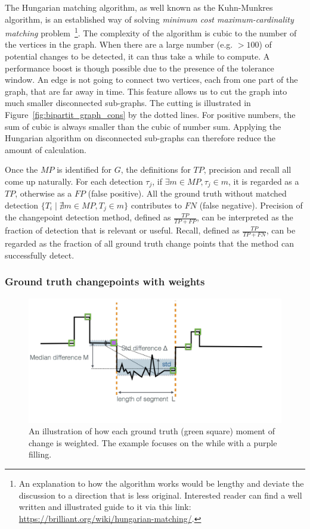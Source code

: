 The Hungarian matching algorithm, as well known as the Kuhn-Munkres algorithm, is an established way of solving \textit{minimum cost maximum-cardinality matching} problem~\footnote{An explanation to how the algorithm works would be lengthy and deviate the discussion to a direction that is less original. Interested reader can find a well written and illustrated guide to it via this link: \url{https://brilliant.org/wiki/hungarian-matching/}.}. 
The complexity of the algorithm is cubic to the number of the vertices in the graph.
When there are a large number (e.g. $> 100$) of potential changes to be detected, it can thus take a while to compute.
A performance boost is though possible due to the presence of the tolerance window.
An edge is not going to connect two vertices, each from one part of the graph, that are far away in time.
This feature allows us to cut the graph into much smaller disconnected sub-graphs.
The cutting is illustrated in Figure~\ref{fig:bipartit_graph_cons} by the dotted lines.
For positive numbers, the sum of cubic is always smaller than the cubic of number sum.
Applying the Hungarian algorithm on disconnected sub-graphs can therefore reduce the amount of calculation.

Once the $MP$ is identified for $G$, the definitions for $TP$, precision and recall all come up naturally.
For each detection $\tau_j$, if $\exists m \in MP, \tau_j \in m$, it is regarded as a $TP$, otherwise as a $FP$ (false positive).
All the ground truth without matched detection $\{T_i \mid \nexists m \in MP, T_j \in m\}$ contributes to $FN$ (false negative).
Precision of the changepoint detection method, defined as  $\frac{TP}{TP+FP}$, can be interpreted as the fraction of detection that is relevant or useful.
Recall, defined as $\frac{TP}{TP+FN}$, can be regarded as the fraction of all ground truth change points that the method can successfully detect.


\subsubsection{Ground truth changepoints with weights}
\begin{figure}[!htb]
\centering
\includegraphics[width=.8\textwidth]{gfx/chap4/groundtruth_weight.pdf}
\caption{An illustration of how each ground truth (green square) moment of change is weighted. The example focuses on the while with a purple filling.}
\label{fig:groundtruth_weight}
\end{figure}

